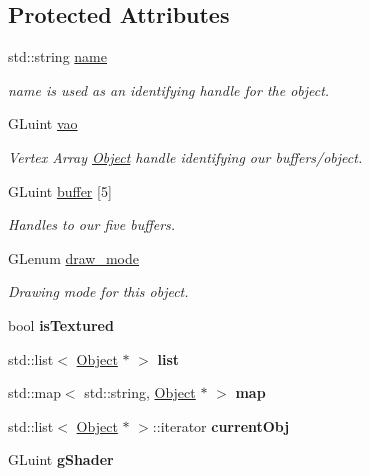 \subsection*{Protected Attributes}
\begin{DoxyCompactItemize}
\item 
std\-::string \hyperlink{class_object_a24457e0a387492c80594aec7681a2277}{name}
\begin{DoxyCompactList}\small\item\em name is used as an identifying handle for the object. \end{DoxyCompactList}\item 
G\-Luint \hyperlink{class_object_a66190fee29d03d6478516686cbd01eb8}{vao}
\begin{DoxyCompactList}\small\item\em Vertex Array \hyperlink{class_object}{Object} handle identifying our buffers/object. \end{DoxyCompactList}\item 
\hypertarget{class_object_a5af1a967c6487d9a76f7a26c9c83e646}{G\-Luint \hyperlink{class_object_a5af1a967c6487d9a76f7a26c9c83e646}{buffer} \mbox{[}5\mbox{]}}\label{class_object_a5af1a967c6487d9a76f7a26c9c83e646}

\begin{DoxyCompactList}\small\item\em Handles to our five buffers. \end{DoxyCompactList}\item 
G\-Lenum \hyperlink{class_object_a82764b385767d989f27d301ab206acb8}{draw\-\_\-mode}
\begin{DoxyCompactList}\small\item\em Drawing mode for this object. \end{DoxyCompactList}\item 
\hypertarget{class_object_a2bbbe3a5b33cbcfc4c536b49d470a6b8}{bool {\bfseries is\-Textured}}\label{class_object_a2bbbe3a5b33cbcfc4c536b49d470a6b8}

\item 
\hypertarget{class_scene_ac04ab16dd305db619afe5f8ec6a02ebc}{std\-::list$<$ \hyperlink{class_object}{Object} $\ast$ $>$ {\bfseries list}}\label{class_scene_ac04ab16dd305db619afe5f8ec6a02ebc}

\item 
\hypertarget{class_scene_ad4f10706155e3e956fe36a4b5f0ef731}{std\-::map$<$ std\-::string, \hyperlink{class_object}{Object} $\ast$ $>$ {\bfseries map}}\label{class_scene_ad4f10706155e3e956fe36a4b5f0ef731}

\item 
\hypertarget{class_scene_acbf527a005c67461e03d343a9f853807}{std\-::list$<$ \hyperlink{class_object}{Object} $\ast$ $>$\-::iterator {\bfseries current\-Obj}}\label{class_scene_acbf527a005c67461e03d343a9f853807}

\item 
\hypertarget{class_scene_aece20244e3987065f05057452a14d81f}{G\-Luint {\bfseries g\-Shader}}\label{class_scene_aece20244e3987065f05057452a14d81f}

\end{DoxyCompactItemize}
